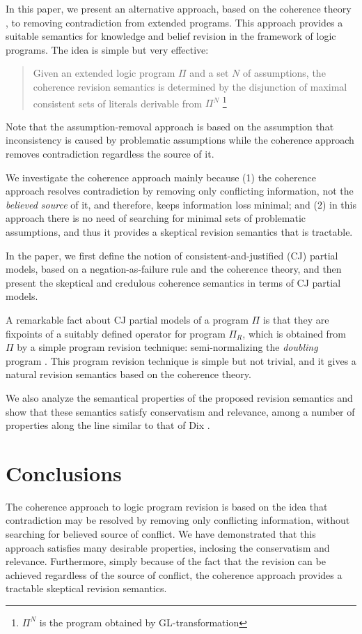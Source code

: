 In this paper, we present an alternative approach, based on the
coherence theory \cite{gardenfors92}, to removing contradiction
from extended programs. This approach provides a suitable semantics for
knowledge and belief revision in the framework of logic programs. 
The idea is simple but very effective:
\begin{quotation}
\noindent
Given an extended logic program $\Pi$ and a set $N$ of assumptions,
the coherence revision semantics is determined by the disjunction of
maximal consistent sets of literals 
derivable from $\Pi^N$
\footnote{$\Pi^N$ is the program obtained by GL-transformation}
\end{quotation}
Note that the assumption-removal approach is based on the assumption that
inconsistency is caused by problematic assumptions while the coherence
approach removes contradiction regardless the source of it.

We investigate the coherence approach mainly because 
(1) the coherence approach resolves contradiction by removing only
conflicting 
information, not the {\em believed source} of it, and therefore, 
keeps information loss  minimal; and (2) in this approach
there is no need
of searching for minimal sets of problematic assumptions, and thus 
it provides a skeptical revision semantics that is tractable.

In the paper, we first define the notion of consistent-and-justified (CJ)
partial models, based on a negation-as-failure 
rule and the coherence theory, and then present the skeptical and credulous
coherence semantics in terms of CJ partial models. 

A remarkable fact about CJ partial models of a program $\Pi$
is that they are fixpoints of a suitably defined operator for 
program $\Pi_R$, which is obtained from $\Pi$
by a simple program revision technique:
semi-normalizing the {\em doubling} program \cite{wallace90}. 
This program revision technique is simple but not trivial, and it gives
a natural revision semantics based on the coherence theory.

We also analyze the semantical properties of the proposed revision
semantics and show that these semantics satisfy conservatism and 
relevance, among a number of properties along the line similar to that of 
Dix \cite{dix94b}.  


\section{Conclusions}
The coherence approach to logic program revision is based on the idea
that contradiction may be resolved by removing only conflicting
information, without searching for believed source of conflict.
We have demonstrated that this approach satisfies many desirable
properties,
inclosing the conservatism and relevance. Furthermore, simply because
of the fact that the revision can be achieved regardless of the source
of conflict, the coherence approach provides a tractable
skeptical revision semantics.

